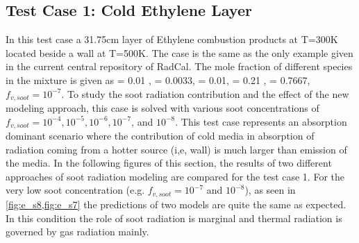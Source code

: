 \documentclass[3p]{elsarticle}
\begin{document}
\subsection{Test Case 1: Cold Ethylene Layer}
In this test case a 31.75cm layer of Ethylene combustion products at T=300K located beside a wall at T=500K. The case is the same as the only example given in the current central repository of RadCal. The mole fraction of different species in the mixture is given as   = 0.01 , = 0.0033, = 0.01, = 0.21 , = 0.7667, \(f_{v,soot}=10^{-7}\). To study the soot radiation contribution and the effect of the new modeling approach, this case is solved with various soot concentrations of \(f_{v,soot}=10^{-4}, 10^{-5}, 10^{-6}, 10^{-7}\), and \(10^{-8}\). This test case represents an absorption dominant scenario where the contribution of cold media in absorption of radiation coming from a hotter source (i,e, wall) is much larger than emission of the media. 
In the following figures of this section, the results of two different approaches of soot radiation modeling are compared for the test case 1.
For the very low soot concentration (e.g. \(f_{v,soot}=10^{-7}\) and \(10^{-8}\)), as seen in  \cref{fig:e_s8,fig:e_s7} the predictions of two models are quite the same as expected. In this condition the role of soot radiation is marginal and thermal radiation is governed by gas radiation mainly.
\end{document}
